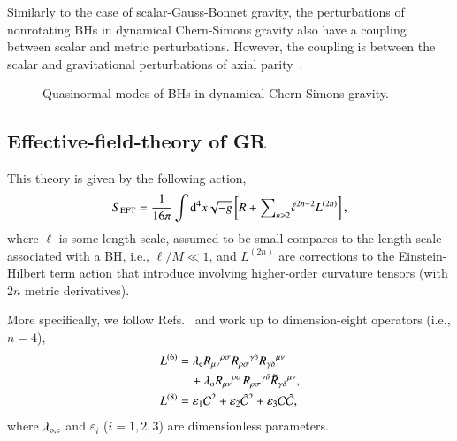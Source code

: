 \documentclass[twocolumn,prd,aps,superscriptaddress,preprintnumbers,tightenlines,showpacs,nofootinbib,eqsecnum,amsfonts,amsmath,longbibliography]{revtex4-1}
\newcommand{\dd}{{\rm d}}
\newcommand{\lame}{\lambda_{\rm e}}
\newcommand{\lamo}{\lambda_{\rm o}}
\begin{document}
Similarly to the case of scalar-Gauss-Bonnet gravity, the perturbations of nonrotating
BHs in dynamical Chern-Simons gravity also have a coupling between scalar and
metric perturbations. However, the coupling is between the scalar and gravitational perturbations
of axial parity~\cite{Yunes:2007ss,Cardoso:2009pk,Molina:2010fb,Wagle:2021tam}.

\begin{figure}
\caption{Quasinormal modes of BHs in dynamical Chern-Simons gravity.}
\end{figure}

\subsection{Effective-field-theory of GR}

This theory is given by the following action,
%
\begin{equation} \label{eq:action_eft}
    S_{\rm EFT} = \frac{1}{16 \pi}
    \int \dd^4x \sqrt{-g}
    \left[ R
    +
    \footnotesize{\sum}_{n \geqslant 2} \ell^{2n - 2} L^{(2n)}
    \right],
\end{equation}
%
where $\ell$ is some length scale, assumed to be small compares to the length
scale associated with a BH, i.e., $\ell / M \ll 1$, and
$L^{(2n)}$ are corrections to the Einstein-Hilbert term action that
introduce involving higher-order curvature tensors (with $2n$ metric
derivatives).

More specifically, we follow Refs.~\cite{Cano:2020cao,Cano:2021myl} and work up
to dimension-eight operators (i.e., $n=4$),
%
\begin{subequations}
\label{eq:action_mods}
\begin{align}
    L^{(6)} &= \lame R_{\mu\nu}{}^{\rho\sigma} R_{\rho\sigma}{}^{\gamma\delta} R_{\gamma \delta}{}^{\mu\nu}
    \nonumber \\
            &\quad + \lamo R_{\mu\nu}{}^{\rho\sigma} R_{\rho\sigma}{}^{\gamma\delta} \tilde{R}_{\gamma \delta}{}^{\mu\nu},
    \label{eq:s_6}
    \\
    L^{(8)} &= \varepsilon_{1} \mathcal{C}^2
    + \varepsilon_{2} \tilde{\mathcal{C}}^{2}
    + \varepsilon_{3} \mathcal{C} \tilde{\mathcal{C}},
\label{eq:s_8}
\end{align}
\end{subequations}
%
where $\lambda_{\rm o, e}$ and $\varepsilon_{i}$ ($i=1,2,3$) are dimensionless parameters.
\end{document}
